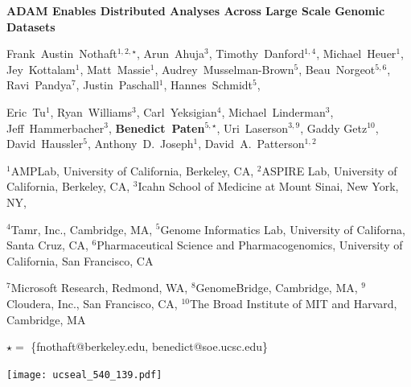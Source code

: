 \documentclass[11pt]{a0poster}
\date{}
\begin{document}
\begin{minipage}{0.887\linewidth}
\vspace{75pt}
\hspace{92pt}
\color{Blue}
{\fontsize{2.5cm}{1em} \textbf{ADAM Enables Distributed Analyses Across Large Scale Genomic Datasets}}

\hspace{92pt}
\fontsize{1cm}{1em}
Frank~Austin~Nothaft$^{1,2,\star}$, Arun~Ahuja$^3$, Timothy~Danford$^{1,4}$,
Michael~Heuer$^1$, Jey~Kottalam$^1$, Matt~Massie$^1$, Audrey~Musselman-Brown$^5$,
Beau~Norgeot$^{5,6}$, Ravi~Pandya$^7$, Justin~Paschall$^1$, Hannes~Schmidt$^5$,

\hspace{100pt} Eric~Tu$^1$, Ryan~Williams$^3$,
Carl~Yeksigian$^4$, Michael~Linderman$^3$, Jeff~Hammerbacher$^3$,
\textbf{Benedict~Paten}$^{5,\star}$, Uri~Laserson$^{3,9}$, Gaddy Getz$^{10}$,
David~Haussler$^5$, Anthony~D.~Joseph$^1$, David~A.~Patterson$^{1,2}$

\hspace{100pt}
$^1$AMPLab, University of California, Berkeley, CA,
$^2$ASPIRE Lab, University of California, Berkeley, CA,
$^3$Icahn School of Medicine at Mount Sinai, New York, NY,

\hspace{100pt}
$^4$Tamr, Inc., Cambridge, MA,
$^5$Genome Informatics Lab, University of Californa, Santa Cruz, CA,
$^6$Pharmaceutical Science and Pharmacogenomics, University of California, San Francisco, CA

\hspace{100pt}
$^7$Microsoft Research, Redmond, WA,
$^8$GenomeBridge, Cambridge, MA,
$^9$Cloudera, Inc., San Francisco, CA,
$^{10}$The Broad Institute of MIT and Harvard, Cambridge, MA

\hspace{100pt}
\fontsize{1cm}{1em}
$\star =$ \{fnothaft@berkeley.edu, benedict@soe.ucsc.edu\}
\vspace{75pt}
\end{minipage}
\begin{minipage}{0.113\linewidth}
\texttt{[image: ucseal\_540\_139.pdf]}
\end{minipage}

{\color{Blue}\noindent\makebox[\linewidth]{\rule{\paperwidth}{30pt}}}
\end{document}
